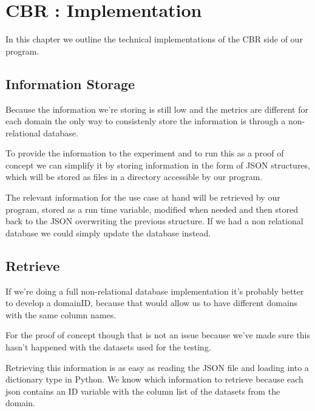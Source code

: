 %
%

\chapter{CBR : Implementation}
\linespread{1.6}
\begin{resumen}
In this chapter we outline the technical implementations of the CBR side of our program.
\end{resumen}

\section{Information Storage}
\label{cap6:sec:informationstorage}

Because the information we're storing is still low and the metrics are different for each domain the only way to consistenly store the information is through a non-relational database.

To provide the information to the experiment and to run this as a proof of concept we can simplify it by storing information in the form of JSON structures, which will be stored as files in a directory accessible by our program.

The relevant information for the use case at hand will be retrieved by our program, stored as a run time variable, modified when needed and then stored back to the JSON overwriting the previous structure.
If we had a non relational database we could simply update the database instead.

\section{Retrieve}
\label{cap6:sec:retrieve}
If we're doing a full non-relational database implementation it's probably better to develop a domainID, because that would allow us to have different domains with the same column names.

For the proof of concept though that is not an issue because we've made sure this hasn't happened with the datasets used for the testing.

Retrieving this information is as easy as reading the JSON file and loading into a dictionary type in Python. We know which information to retrieve because each json contains an ID variable with the column list of the datasets from the domain.

